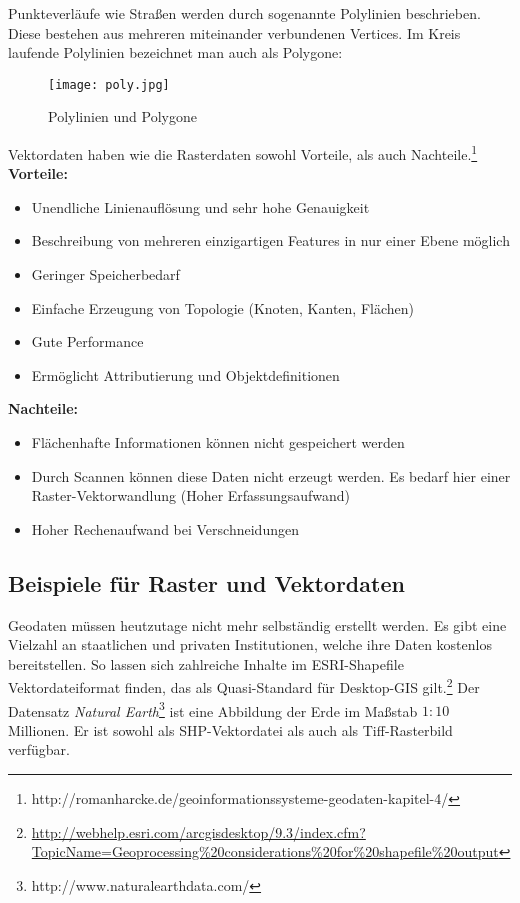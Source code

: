\documentclass[11pt,ceqn]{book}
\begin{document}

Punkteverläufe wie Straßen werden durch sogenannte Polylinien beschrieben. Diese bestehen aus mehreren miteinander verbundenen Vertices. Im Kreis laufende Polylinien bezeichnet man auch als Polygone:

\begin{figure}[H]
\centering
\texttt{[image: poly.jpg]}
\caption{Polylinien und Polygone \protect\footnotemark}
\end{figure}


Vektordaten haben wie die Rasterdaten sowohl Vorteile, als auch Nachteile.\footnote{http://romanharcke.de/geoinformationssysteme-geodaten-kapitel-4/}\newline
\textbf{Vorteile:}
\begin{itemize}
\item Unendliche Linienauflösung und sehr hohe Genauigkeit
\item Beschreibung von mehreren einzigartigen Features in nur einer Ebene möglich
\item Geringer Speicherbedarf
\item Einfache Erzeugung von Topologie (Knoten, Kanten, Flächen)
\item Gute Performance
\item Ermöglicht Attributierung und Objektdefinitionen
\end{itemize}
\textbf{Nachteile:}
\begin{itemize}
\item Flächenhafte Informationen können nicht gespeichert werden 
\item Durch Scannen können diese Daten nicht erzeugt werden. Es bedarf hier einer Raster-Vektorwandlung (Hoher Erfassungsaufwand)
\item Hoher Rechenaufwand bei Verschneidungen
\end{itemize}

\subsection{Beispiele für Raster und Vektordaten}
Geodaten müssen heutzutage nicht mehr selbständig erstellt werden. Es gibt eine Vielzahl an staatlichen und privaten Institutionen, welche ihre Daten kostenlos bereitstellen. So lassen sich zahlreiche Inhalte im ESRI-Shapefile Vektordateiformat finden, das als Quasi-Standard für Desktop-GIS gilt.\footnote{\url{http://webhelp.esri.com/arcgisdesktop/9.3/index.cfm?TopicName=Geoprocessing\%20considerations\%20for\%20shapefile\%20output}}
Der Datensatz \textit{Natural Earth}\footnote{http://www.naturalearthdata.com/} ist eine Abbildung der Erde im Maßstab $1:10$ Millionen. Er ist sowohl als SHP-Vektordatei als auch als Tiff-Rasterbild verfügbar.
\end{document}
